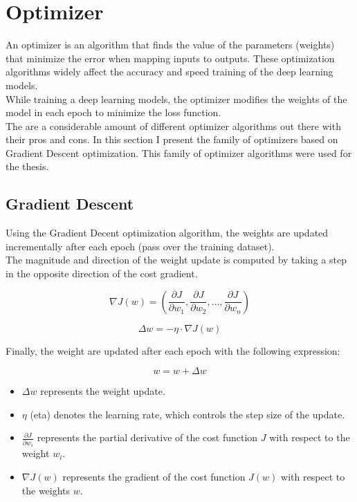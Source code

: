 \section{Optimizer}

An optimizer is an algorithm that finds the value of the parameters (weights) that minimize the error when mapping inputs to outputs. These optimization algorithms widely affect the accuracy and speed training of the deep learning models. \\

While training a deep learning models, the optimizer modifies the weights of the model in each epoch to minimize the loss function. \\

The are a considerable amount of different optimizer algorithms out there with their pros and cons.
In this section I present the family of optimizers based on Gradient Descent optimization. This family of optimizer algorithms were used for the thesis. \\

\subsection{Gradient Descent}

Using the Gradient Decent optimization algorithm, the weights are updated incrementally after each epoch (pass over the training dataset). \\

The magnitude and direction of the weight update is computed by taking a step in the opposite direction of the cost gradient.

\[\nabla J(w) = (\frac{\partial J}{\partial w_1}, \frac{\partial J}{\partial w_2}, \ldots, \frac{\partial J}{\partial w_n})\]

\[
\Delta w = -\eta \cdot \nabla J(w)
\]

Finally, the weight are updated after each epoch with the following expression:

\[
w = w + \Delta w
\]


\begin{itemize}
    \item \(\Delta w\) represents the weight update.
    \item \(\eta\) (eta) denotes the learning rate, which controls the step size of the update.
    \item  \(\frac{\partial J}{\partial w_i}\) represents the partial derivative of the cost function \(J\) with respect to the weight \(w_i\).
    \item \(\nabla J(w)\) represents the gradient of the cost function \(J(w)\) with respect to the weights \(w\).
\end{itemize}

